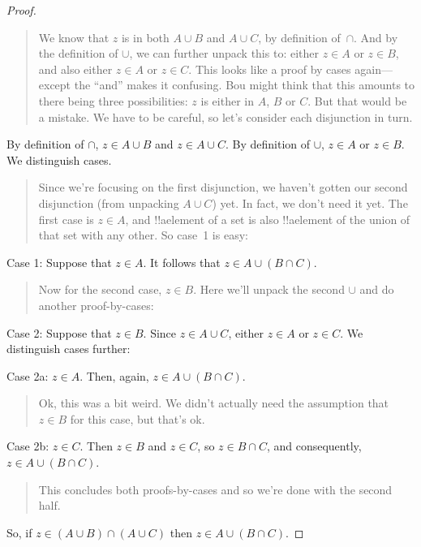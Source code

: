 \documentclass[../../../include/open-logic-section]{subfiles}
\begin{document}
\begin{proof}
\begin{quote}
We know that $z$ is in both $A \cup B$ and $A \cup C$, by definition
of~$\cap$. And by the definition of $\cup$, we can further unpack this
to: either $z \in A$ or $z \in B$, and also either $z \in A$ or $z \in
C$. This looks like a proof by cases again---except the ``and'' makes
it confusing. Bou might think that this amounts to there being three
possibilities: $z$ is either in $A$, $B$ or $C$. But that would be a
mistake.  We have to be careful, so let's consider each disjunction in
turn.
\end{quote}
By definition of $\cap$, $z \in A \cup B$ and $z \in A \cup C$. By
definition of $\cup$, $z \in A$ or $z \in B$. We distinguish cases.
\begin{quote}
Since we're focusing on the first disjunction, we haven't gotten our
second disjunction (from unpacking $A \cup C$) yet. In fact, we don't
need it yet. The first case is $z \in A$, and !!a{element} of a set is
also !!a{element} of the union of that set with any other. So case~1
is easy:
\end{quote}
Case 1: Suppose that $z \in A$. It follows that $z \in A \cup (B \cap
C)$.
\begin{quote}
Now for the second case, $z \in B$. Here we'll unpack the second
$\cup$ and do another proof-by-cases:
\end{quote}
Case 2: Suppose that $z \in B$. Since $z \in A \cup C$, either $z \in
A$ or $z \in C$. We distinguish cases further:

Case 2a: $z \in A$. Then, again, $z \in A \cup (B \cap C)$.
\begin{quote}
Ok, this was a bit weird. We didn't actually need the assumption
that~$z \in B$ for this case, but that's ok.
\end{quote}
Case 2b: $z \in C$. Then $z \in B$ and $z \in C$, so $z \in B \cap C$,
and consequently, $z \in A \cup (B \cap C)$.
\begin{quote}
This concludes both proofs-by-cases and so we're done with the second
half.
\end{quote}
So, if $z \in (A \cup B) \cap (A \cup C)$ then $z \in A \cup (B \cap C)$.
\end{proof}
\end{document}
